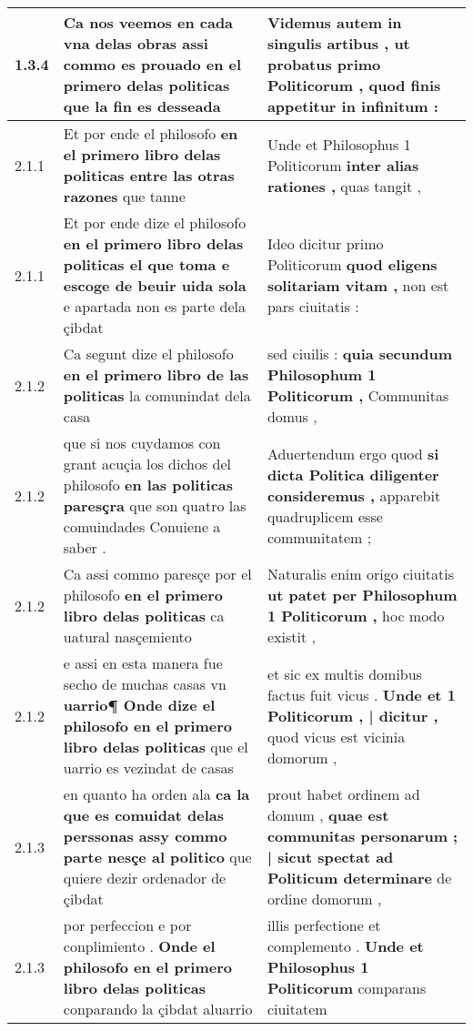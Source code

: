 \begin{tabular}{|p{1cm}|p{6.5cm}|p{6.5cm}|}
1.3.4 & Ca nos veemos en cada vna delas obras \textbf{ assi commo es prouado en el primero delas politicas } que la fin es desseada & Videmus autem in singulis artibus , \textbf{ ut probatus primo Politicorum , } quod finis appetitur in infinitum : \\\hline
2.1.1 & Et por ende el philosofo \textbf{ en el primero libro delas politicas entre las otras razones } que tanne & Unde et Philosophus 1 Politicorum \textbf{ inter alias rationes , } quas tangit , \\\hline
2.1.1 & Et por ende dize el philosofo \textbf{ en el primero libro delas politicas el que toma e escoge de beuir uida sola } e apartada non es parte dela çibdat & Ideo dicitur primo Politicorum \textbf{ quod eligens solitariam vitam , } non est pars ciuitatis : \\\hline
2.1.2 & Ca segunt dize el philosofo \textbf{ en el primero libro de las politicas } la comunindat dela casa & sed ciuilis : \textbf{ quia secundum Philosophum 1 Politicorum , } Communitas domus , \\\hline
2.1.2 & que si nos cuydamos con grant acuçia los dichos del philosofo \textbf{ en las politicas paresçra } que son quatro las comuindades Conuiene a saber . & Aduertendum ergo quod \textbf{ si dicta Politica diligenter consideremus , } apparebit quadruplicem esse communitatem ; \\\hline
2.1.2 & Ca assi commo paresçe por el philosofo \textbf{ en el primero libro delas politicas } ca uatural nasçemiento & Naturalis enim origo ciuitatis \textbf{ ut patet per Philosophum 1 Politicorum , } hoc modo existit , \\\hline
2.1.2 & e assi en esta manera fue secho de muchas casas vn \textbf{ uarrio¶ Onde dize el philosofo en el primero libro delas politicas } que el uarrio es vezindat de casas & et sic ex multis domibus factus fuit vicus . \textbf{ Unde et 1 Politicorum , | dicitur , } quod vicus est vicinia domorum , \\\hline
2.1.3 & en quanto ha orden ala \textbf{ ca la que es comuidat delas perssonas assy commo parte nesçe al politico } que quiere dezir ordenador de çibdat & prout habet ordinem ad domum , \textbf{ quae est communitas personarum ; | sicut spectat ad Politicum determinare } de ordine domorum , \\\hline
2.1.3 & por perfeccion e por conplimiento . \textbf{ Onde el philosofo en el primero libro delas politicas } conparando la çibdat aluarrio & illis perfectione et complemento . \textbf{ Unde et Philosophus 1 Politicorum } comparans ciuitatem \\\hline

\end{tabular}
